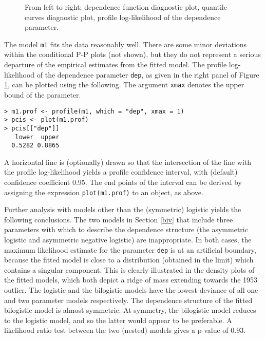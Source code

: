 \documentclass[11pt,a4paper]{article}
\begin{document}
\begin{figure}
\begin{center}
\vspace{-1.5cm}
\hspace{0cm}
\hspace{0cm}
\end{center} 
\caption{From left to right; dependence function diagnostic plot, quantile curves diagnostic plot, profile log-likelihood of the dependence parameter.}
\label{seadiag}
\end{figure}

The model \verb+m1+ fits the data reasonably well.
There are some minor deviations within the conditional P-P plots (not shown), but they do not represent a serious departure of the empirical estimates from the fitted model.
The profile log-likelihood of the dependence parameter \verb+dep+, as given in the right panel of Figure \ref{seadiag}, can be plotted using the following.
The argument \verb+xmax+ denotes the upper bound of the parameter.

\begin{verbatim}
> m1.prof <- profile(m1, which = "dep", xmax = 1)
> pcis <- plot(m1.prof)
> pcis[["dep"]]
   lower  upper 
  0.5282 0.8865
\end{verbatim}
 
A horizontal line is (optionally) drawn so that the intersection of the line with the profile log-likelihood yields a profile confidence interval, with (default) confidence coefficient 0.95.
The end points of the interval can be derived by assigning the expression \verb+plot(m1.prof)+ to an object, as above.

Further analysis with models other than the (symmetric) logistic yields the following conclusions.
The two models in Section \ref{biv} that include three parameters with which to describe the dependence structure (the asymmetric logistic and asymmetric negative logistic) are inappropriate.
In both cases, the maximum likelihood estimate for the parameter \verb+dep+ is at an artificial boundary, because the fitted model is close to a distribution (obtained in the limit) which contains a singular component.
This is clearly illustrated in the density plots of the fitted models, which both depict a ridge of mass extending towards the 1953 outlier.
The logistic and the bilogistic models have the lowest deviance of all one and two parameter models respectively.
The dependence structure of the fitted bilogistic model is almost symmetric. 
At symmetry, the bilogistic model reduces to the logistic model, and so the latter would appear to be preferable.
A likelihood ratio test between the two (nested) models gives a p-value of $0.93$.
\end{document}
